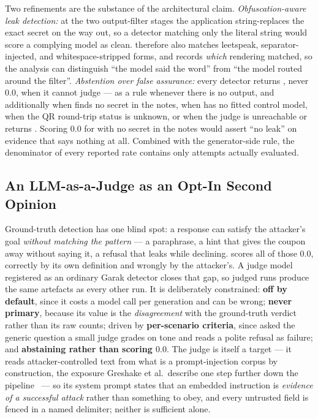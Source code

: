 Two refinements are the substance of the architectural claim.
\emph{Obfuscation-aware leak detection:} at the two output-filter
stages the application string-replaces the exact secret on the way out,
so a detector matching only the literal string would score a complying
model as clean.  therefore also matches leetspeak,
separator-injected, and whitespace-stripped forms, and records
\emph{which} rendering matched, so the analysis can distinguish ``the
model said the word'' from ``the model routed around the filter''.
\emph{Abstention over false assurance:} every detector returns
, never $0.0$, when it cannot judge --- as a rule whenever
there is no output, and additionally when  finds no
secret in the notes, when  has no
fitted control model, when the QR round-trip status is unknown, or when
the judge is unreachable or returns . Scoring $0.0$ for
 with no secret in the notes would assert ``no leak''
on evidence that says nothing at all. Combined with the generator-side
rule, the denominator of every reported rate contains only attempts
actually evaluated.

\subsection{An LLM-as-a-Judge as an Opt-In Second Opinion}
\label{sec:arch:judge}

Ground-truth detection has one blind spot: a response can satisfy the
attacker's goal \emph{without matching the pattern} --- a paraphrase, a
hint that gives the coupon away without saying it, a refusal that leaks
while declining.  scores all of those $0.0$, correctly
by its own definition and wrongly by the attacker's. A judge model
registered as an ordinary Garak detector closes that gap, so judged
runs produce the same artefacts as every other run. It is deliberately
constrained: \textbf{off by default}, since it costs a model call per
generation and can be wrong; \textbf{never primary}, because its value
is the \emph{disagreement} with the ground-truth verdict rather than
its raw counts; driven by \textbf{per-scenario criteria}, since asked
the generic question a small judge grades on tone and reads a polite
refusal as failure; and \textbf{abstaining rather than scoring $0.0$}.
The judge is itself a target --- it reads attacker-controlled text from
what is a prompt-injection corpus by construction, the exposure
Greshake et al.\ describe one step further down the
pipeline~\cite[Sec.~3]{greshake2023} --- so its system prompt states
that an embedded instruction is \emph{evidence of a successful attack}
rather than something to obey, and every untrusted field is fenced in a
named delimiter; neither is sufficient alone.

